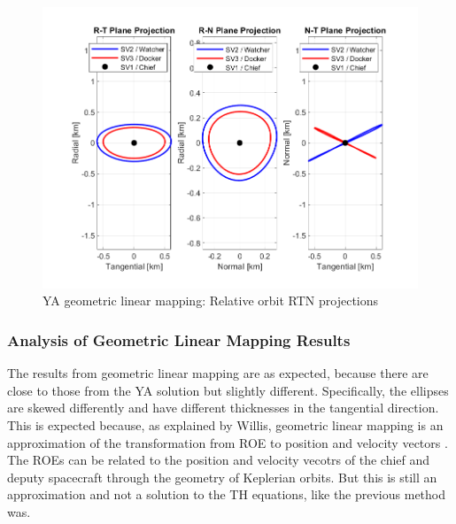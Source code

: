 \begin{figure}[H]
    \centering
    \includegraphics[width=0.7\linewidth]{sim/figures/PS3/RTN_projections_YA_mapping.png}
    \caption{YA geometric linear mapping: Relative orbit RTN projections}
    \label{fig:YA_map_RTN}
\end{figure}

\subsubsection{Analysis of Geometric Linear Mapping Results}\label{sec:geom_mapping_analysis}
The results from geometric linear mapping are as expected, because there are close to those from the YA solution but slightly different. Specifically, the ellipses are skewed differently and have different thicknesses in the tangential direction. This is expected because, as explained by Willis, geometric linear mapping is an approximation of the transformation from ROE to position and velocity vectors \cite{willis2023analytical}. The ROEs can be related to the position and velocity vecotrs of the chief and deputy spacecraft through the geometry of Keplerian orbits. But this is still an approximation and not a solution to the TH equations, like the previous method was. 

